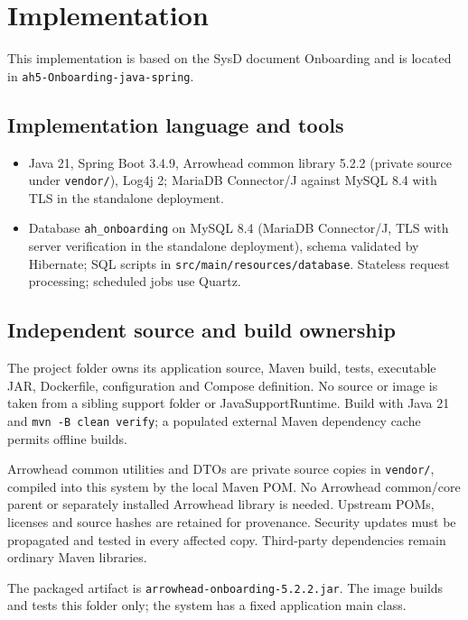 \documentclass[a4paper]{arrowhead}
\begin{document}
\newpage

\section{Implementation}
\label{Implementation}

This implementation is based on the SysD document Onboarding \cite{onb-sysd} and is located in \texttt{ah5-Onboarding-java-spring}.

\subsection{Implementation language and tools}
\begin{itemize}
\item Java 21, Spring Boot 3.4.9, Arrowhead common library 5.2.2 (private source under \texttt{vendor/}), Log4j 2; MariaDB Connector/J against MySQL 8.4 with TLS in the standalone deployment.
\item Database \texttt{ah\_\allowbreak{}onboarding} on MySQL 8.4 (MariaDB Connector/J, TLS with server verification in the standalone deployment), schema validated by Hibernate; SQL scripts in \texttt{src/\allowbreak{}main/\allowbreak{}resources/\allowbreak{}database}. Stateless request processing; scheduled jobs use Quartz.
\end{itemize}

\subsection{Independent source and build ownership}
The project folder owns its application source, Maven build, tests, executable JAR, Dockerfile, configuration and Compose definition. No source or image is taken from a sibling support folder or JavaSupportRuntime. Build with Java 21 and \texttt{mvn -B clean verify}; a populated external Maven dependency cache permits offline builds.

Arrowhead common utilities and DTOs are private source copies in \texttt{vendor/}, compiled into this system by the local Maven POM. No Arrowhead common/core parent or separately installed Arrowhead library is needed. Upstream POMs, licenses and source hashes are retained for provenance. Security updates must be propagated and tested in every affected copy. Third-party dependencies remain ordinary Maven libraries.

The packaged artifact is \texttt{arrowhead-\allowbreak{}onboarding-5.2.2.jar}. The image builds and tests this folder only; the system has a fixed application main class.
\end{document}
